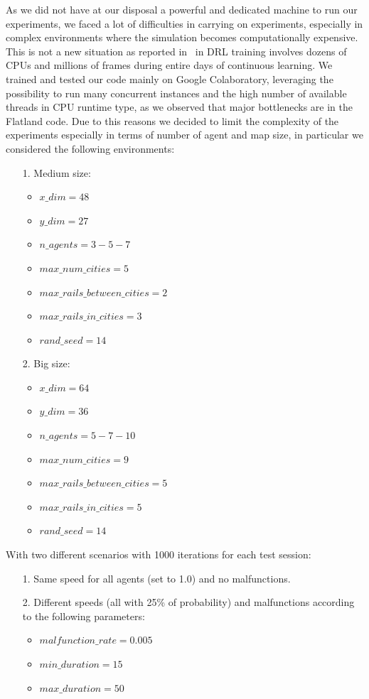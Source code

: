 \documentclass[11pt, a4paper, hidelinks]{report}
\begin{document}
As we did not have at our disposal a powerful and dedicated machine to run our experiments, we faced a lot of difficulties in carrying on experiments, especially in complex environments where the simulation becomes computationally expensive.
This is not a new situation as reported in~\citep{Hernandez-Leal-2019} in DRL training involves dozens of CPUs and millions of frames during entire days of continuous learning.
We trained and tested our code mainly on Google Colaboratory, leveraging the possibility to run many concurrent instances and the high number of available threads in CPU runtime type, as we observed that major bottlenecks are in the Flatland code.
Due to this reasons we decided to limit the complexity of the experiments especially in terms of number of agent and map size, in particular we considered the following environments:
\begin{enumerate}
\item [1.] Medium size:
	\begin{itemize}
	\item $x\_dim = 48$
	\item $y\_dim = 27$
	\item $n\_agents = 3 - 5 - 7$
	\item $max\_num\_cities = 5$
	\item $max\_rails\_between\_cities = 2$
	\item $max\_rails\_in\_cities = 3$
	\item $rand\_seed = 14$
	\end{itemize}\label{itm:evaluation_envs1}
\item [2.] Big size:
	\begin{itemize}
	\item $x\_dim = 64$
	\item $y\_dim = 36$
	\item $n\_agents = 5 - 7 - 10$
	\item $max\_num\_cities = 9$
	\item $max\_rails\_between\_cities = 5$
	\item $max\_rails\_in\_cities = 5$
	\item $rand\_seed = 14$
	\end{itemize}\label{itm:evaluation_envs2}
\end{enumerate}

With two different scenarios with 1000 iterations for each test session:
\begin{enumerate}
\item [1.] Same speed for all agents (set to 1.0) and no malfunctions.
\item [2.] Different speeds (all with 25\% of probability) and malfunctions according to the following parameters:
	\begin{itemize}
	\item $malfunction\_rate = 0.005$
	\item $min\_duration = 15$
	\item $max\_duration = 50$
	\end{itemize}
\end{enumerate}
\end{document}
